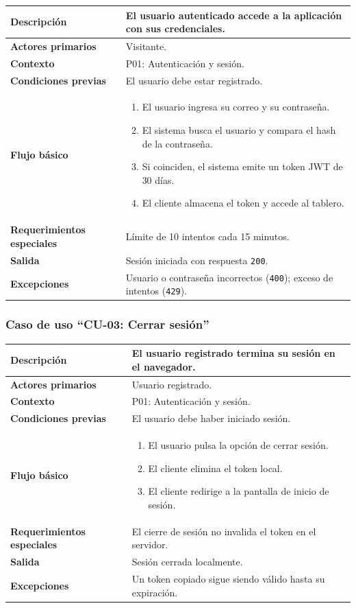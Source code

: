 \documentclass[doc,12pt,a4paper]{apa7}
\begin{document}
\begin{longtable}{|P{3.3cm}|L{11.2cm}|}
\hline
\textbf{Descripción} & El usuario autenticado accede a la aplicación con sus credenciales. \\ \hline
\textbf{Actores primarios} & Visitante. \\ \hline
\textbf{Contexto} & P01: Autenticación y sesión. \\ \hline
\textbf{Condiciones previas} & El usuario debe estar registrado. \\ \hline
\textbf{Flujo básico} &
\begin{enumerate}
    \item El usuario ingresa su correo y su contraseña.
    \item El sistema busca el usuario y compara el hash de la contraseña.
    \item Si coinciden, el sistema emite un token JWT de 30 días.
    \item El cliente almacena el token y accede al tablero.
\end{enumerate} \\ \hline
\textbf{Requerimientos especiales} & Límite de 10 intentos cada 15 minutos. \\ \hline
\textbf{Salida} & Sesión iniciada con respuesta \texttt{200}. \\ \hline
\textbf{Excepciones} & Usuario o contraseña incorrectos (\texttt{400}); exceso de intentos (\texttt{429}). \\ \hline
\end{longtable}

\subsubsection{Caso de uso ``CU-03: Cerrar sesión''}

\begin{longtable}{|P{3.3cm}|L{11.2cm}|}
\hline
\textbf{Descripción} & El usuario registrado termina su sesión en el navegador. \\ \hline
\textbf{Actores primarios} & Usuario registrado. \\ \hline
\textbf{Contexto} & P01: Autenticación y sesión. \\ \hline
\textbf{Condiciones previas} & El usuario debe haber iniciado sesión. \\ \hline
\textbf{Flujo básico} &
\begin{enumerate}
    \item El usuario pulsa la opción de cerrar sesión.
    \item El cliente elimina el token local.
    \item El cliente redirige a la pantalla de inicio de sesión.
\end{enumerate} \\ \hline
\textbf{Requerimientos especiales} & El cierre de sesión no invalida el token en el servidor. \\ \hline
\textbf{Salida} & Sesión cerrada localmente. \\ \hline
\textbf{Excepciones} & Un token copiado sigue siendo válido hasta su expiración. \\ \hline
\end{longtable}
\end{document}

